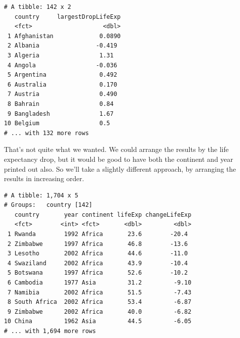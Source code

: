 \documentclass[]{krantz}
\makeatletter
\newenvironment{Shaded}{\begin{snugshade}}{\end{snugshade}}
\newcommand{\KeywordTok}[1]{\textcolor[rgb]{0.27,0.27,0.27}{\textbf{#1}}}
\newcommand{\DataTypeTok}[1]{\textcolor[rgb]{0.27,0.27,0.27}{#1}}
\newcommand{\StringTok}[1]{\textcolor[rgb]{0.5,0.5,0.5}{#1}}
\newcommand{\OperatorTok}[1]{\textcolor[rgb]{0.43,0.43,0.43}{\textbf{#1}}}
\newcommand{\NormalTok}[1]{#1}
\newenvironment{kframe}{%
\medskip{}
\setlength{\fboxsep}{.8em}
 \def\at@end@of@kframe{}%
 \ifinner\ifhmode%
  \def\at@end@of@kframe{\end{minipage}}%
  \begin{minipage}{\columnwidth}%
 \fi\fi%
 \def\FrameCommand##1{\hskip\@totalleftmargin \hskip-\fboxsep
 \colorbox{shadecolor}{##1}\hskip-\fboxsep
     \hskip-\linewidth \hskip-\@totalleftmargin \hskip\columnwidth}%
 \MakeFramed {\advance\hsize-\width
   \@totalleftmargin\z@ \linewidth\hsize
   \@setminipage}}%
 {\par\unskip\endMakeFramed%
 \at@end@of@kframe}
\renewenvironment{Shaded}{\begin{kframe}}{\end{kframe}}
\makeatother
\begin{document}
\begin{verbatim}
# A tibble: 142 x 2
   country     largestDropLifeExp
   <fct>                    <dbl>
 1 Afghanistan             0.0890
 2 Albania                -0.419 
 3 Algeria                 1.31  
 4 Angola                 -0.036 
 5 Argentina               0.492 
 6 Australia               0.170 
 7 Austria                 0.490 
 8 Bahrain                 0.84  
 9 Bangladesh              1.67  
10 Belgium                 0.5   
# ... with 132 more rows
\end{verbatim}

That's not quite what we wanted. We could arrange the results by the
life expectancy drop, but it would be good to have both the continent
and year printed out also. So we'll take a slightly different approach,
by arranging the results in increasing order.

\begin{Shaded}
\end{Shaded}

\begin{verbatim}
# A tibble: 1,704 x 5
# Groups:   country [142]
   country       year continent lifeExp changeLifeExp
   <fct>        <int> <fct>       <dbl>         <dbl>
 1 Rwanda        1992 Africa       23.6        -20.4 
 2 Zimbabwe      1997 Africa       46.8        -13.6 
 3 Lesotho       2002 Africa       44.6        -11.0 
 4 Swaziland     2002 Africa       43.9        -10.4 
 5 Botswana      1997 Africa       52.6        -10.2 
 6 Cambodia      1977 Asia         31.2         -9.10
 7 Namibia       2002 Africa       51.5         -7.43
 8 South Africa  2002 Africa       53.4         -6.87
 9 Zimbabwe      2002 Africa       40.0         -6.82
10 China         1962 Asia         44.5         -6.05
# ... with 1,694 more rows
\end{verbatim}
\end{document}
